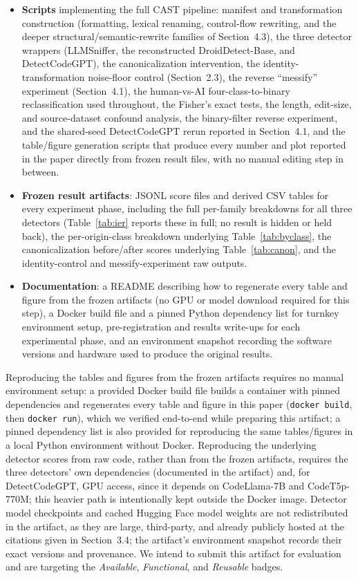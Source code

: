 \documentclass[sigconf,review,anonymous]{acmart}
\begin{document}
\begin{itemize}
\item \textbf{Scripts} implementing the full CAST pipeline: manifest and transformation construction (formatting, lexical renaming, control-flow rewriting, and the deeper structural/semantic-rewrite families of Section~4.3), the three detector wrappers (LLMSniffer, the reconstructed DroidDetect-Base, and DetectCodeGPT), the canonicalization intervention, the identity-transformation noise-floor control (Section~2.3), the reverse ``messify'' experiment (Section~4.1), the human-vs-AI four-class-to-binary reclassification used throughout, the Fisher's exact tests, the length, edit-size, and source-dataset confound analysis, the binary-filter reverse experiment, and the shared-seed DetectCodeGPT rerun reported in Section~4.1, and the table/figure generation scripts that produce every number and plot reported in the paper directly from frozen result files, with no manual editing step in between.
\item \textbf{Frozen result artifacts}: JSONL score files and derived CSV tables for every experiment phase, including the full per-family breakdowns for all three detectors (Table~\ref{tab:ier} reports these in full; no result is hidden or held back), the per-origin-class breakdown underlying Table~\ref{tab:byclass}, the canonicalization before/after scores underlying Table~\ref{tab:canon}, and the identity-control and messify-experiment raw outputs.
\item \textbf{Documentation}: a README describing how to regenerate every table and figure from the frozen artifacts (no GPU or model download required for this step), a Docker build file and a pinned Python dependency list for turnkey environment setup, pre-registration and results write-ups for each experimental phase, and an environment snapshot recording the software versions and hardware used to produce the original results.
\end{itemize}

Reproducing the tables and figures from the frozen artifacts requires no manual environment setup: a provided Docker build file builds a container with pinned dependencies and regenerates every table and figure in this paper (\texttt{docker build}, then \texttt{docker run}), which we verified end-to-end while preparing this artifact; a pinned dependency list is also provided for reproducing the same tables/figures in a local Python environment without Docker. Reproducing the underlying detector scores from raw code, rather than from the frozen artifacts, requires the three detectors' own dependencies (documented in the artifact) and, for DetectCodeGPT, GPU access, since it depends on CodeLlama-7B and CodeT5p-770M; this heavier path is intentionally kept outside the Docker image. Detector model checkpoints and cached Hugging Face model weights are not redistributed in the artifact, as they are large, third-party, and already publicly hosted at the citations given in Section~3.4; the artifact's environment snapshot records their exact versions and provenance. We intend to submit this artifact for evaluation and are targeting the \emph{Available}, \emph{Functional}, and \emph{Reusable} badges.
\end{document}
